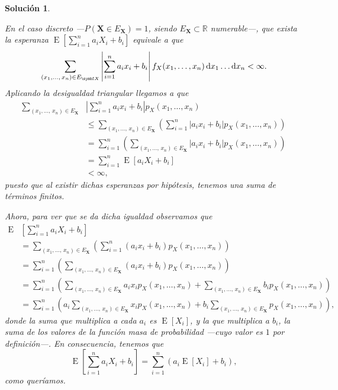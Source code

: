 \documentclass[
  a4paper,
  spanish,
  12pt,
]{scrartcl}
\theoremstyle{ejercicio-style}
\theoremstyle{remark-style}
\newtheorem*{sol}{Solución}
\begin{document}
\begin{sol}
\begin{enumerate}
    En el caso discreto ---\(P(\symbf X \in E_{\symbf X})  =  1\), siendo \(E_{\symbf X} \subset \mathbb R\) numerable---, que exista la esperanza \(\operatorname{E}\left[\sum_{i=1}^n a_iX_i + b_i\right]\) equivale a que \[
      \sum_{(x_1, \dots,\, x_n) \in E_{\symbf X}}\left|\sum_{i=1}^n a_ix_i + b_i\right| f_X(x_1, \dots, x_n)\dif x_1\dots\dif x_n < \infty.
    \] 
    Aplicando la desigualdad triangular llegamos a que \begin{align*}
      \sum_{(x_1, \dots,\, x_n) \in E_{\symbf X}}&\left|\sum_{i=1}^n a_ix_i + b_i\right| p_X(x_1, \dots, x_n)\\
        &\leq \sum_{(x_1, \dots,\, x_n) \in E_{\symbf X}}\left(\sum_{i=1}^n \left|a_ix_i + b_i\right| p_X(x_1, \dots, x_n)\right)\\
        &= \sum_{i=1}^n\left(\sum_{(x_1, \dots,\, x_n) \in E_{\symbf X}}\left|a_ix_i + b_i\right| p_X(x_1, \dots, x_n)\right)\\
        &= \sum_{i=1}^n \operatorname{E}[a_iX_i + b_i]\\
        &< \infty,
    \end{align*} puesto que al existir dichas esperanzas por hipótesis, tenemos una suma de términos finitos.

    Ahora, para ver que se da dicha igualdad observamos que \begin{align*}
      \operatorname{E}&\left[\sum_{i=1}^n a_iX_i + b_i\right] \\
        &= \sum_{(x_1, \dots,\, x_n) \in E_{\symbf X}}\left(\sum_{i=1}^n (a_ix_i + b_i) p_X(x_1, \dots, x_n)\right)\\
        &= \sum_{i=1}^n\left(\sum_{(x_1, \dots,\, x_n) \in E_{\symbf X}} (a_ix_i + b_i) p_X(x_1, \dots, x_n)\right)\\
        &= \sum_{i=1}^n\left(\sum_{(x_1, \dots,\, x_n) \in E_{\symbf X}} a_ix_ip_X(x_1, \dots, x_n) + \sum_{(x_1, \dots,\, x_n) \in E_{\symbf X}} b_ip_X(x_1, \dots, x_n)\right)\\
        &= \sum_{i=1}^n\left(a_i\sum_{(x_1, \dots,\, x_n) \in E_{\symbf X}}x_ip_X(x_1, \dots, x_n) + b_i\sum_{(x_1, \dots,\, x_n) \in E_{\symbf X}} p_X(x_1, \dots, x_n)\right),
    \end{align*} donde la suma que multiplica a cada \(a_i\) es \(\operatorname{E}[X_i]\), y la que multiplica a \(b_i\), la suma de los valores de la función masa de probabilidad ---cuyo valor es \(1\) por definición---. 
    En consecuencia, tenemos que \[
      \operatorname{E}\left[\sum_{i=1}^n a_iX_i + b_i\right] = \sum_{i=1}^n\left(a_i \operatorname{E}[X_i] + b_i\right),
    \] como queríamos.
  

\end{enumerate}
\end{sol}
\end{document}

